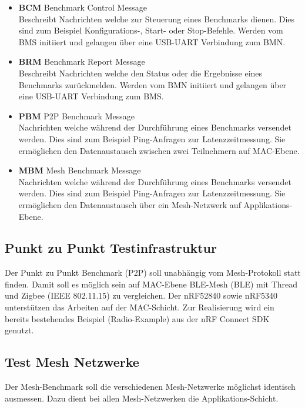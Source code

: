 \begin{itemize}
	\item \textbf{BCM} Benchmark Control Message \\ 
	Beschreibt Nachrichten welche zur Steuerung eines Benchmarks dienen. Dies sind zum Beispiel Konfigurations-, Start- oder Stop-Befehle. Werden vom BMS  initiiert und gelangen über eine USB-UART Verbindung zum BMN. 
	\item \textbf{BRM} Benchmark Report Message \\ 
	Beschreibt Nachrichten welche den Status oder die Ergebnisse eines Benchmarks zurückmelden. Werden vom BMN initiiert und gelangen über eine USB-UART Verbindung zum BMS.
	\item \textbf{PBM} P2P Benchmark Message \\ 
	Nachrichten welche während der Durchführung eines Benchmarks versendet werden. Dies sind zum Beispiel Ping-Anfragen zur Latenzzeitmessung. Sie ermöglichen den Datenaustausch zwischen zwei Teilnehmern auf MAC-Ebene. 
	\item \textbf{MBM} Mesh Benchmark Message \\ 
	Nachrichten welche während der Durchführung eines Benchmarks versendet werden. Dies sind zum Beispiel Ping-Anfragen zur Latenzzeitmessung. Sie ermöglichen den Datenaustausch über ein Mesh-Netzwerk auf Applikations-Ebene. 
\end{itemize}

\subsection{Punkt zu Punkt Testinfrastruktur}\label{subsec:PunktzuPunktTestinfrastruktur}

Der Punkt zu Punkt Benchmark (P2P) soll unabhängig vom Mesh-Protokoll statt finden. Damit soll es möglich sein auf MAC-Ebene BLE-Mesh (BLE) mit Thread und Zigbee (IEEE 802.11.15) zu vergleichen. Der nRF52840 sowie nRF5340 unterstützen das Arbeiten auf der MAC-Schicht. Zur Realisierung wird ein bereits bestehendes Beispiel (Radio-Example) aus der nRF Connect SDK genutzt.


\subsection{Test Mesh Netzwerke}\label{subsec:TestMeshNetzwerke}

Der Mesh-Benchmark soll die verschiedenen Mesh-Netzwerke möglichst identisch ausmessen. Dazu dient bei allen Mesh-Netzwerken die Applikations-Schicht.   

